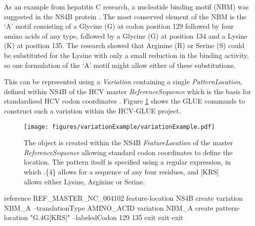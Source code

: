 As an example from hepatitis C research, a nucleotide binding motif (NBM) was
suggested in the NS4B protein \cite{Einav_2004}. The most conserved element of
the NBM is the `A' motif consisting of a Glycine (G) at codon position 129
followed by four amino acids of any type, followed by a Glycine (G) at position
134 and a Lysine (K) at position 135. The research showed that Arginine (R) or
Serine (S) could be substituted for the Lysine with only a small reduction in
the binding activity, so one formulation of the `A' motif might allow either of
these substitutions.

This can be represented using a \emph{Variation} containing a single
\emph{PatternLocation}, defined within NS4B of the HCV master
\emph{ReferenceSequence} which is the basis for standardised HCV codon
coordinates \cite{Kuiken_2006}. Figure \ref{fig:variationExample} shows the GLUE
commands to construct such a variation within the HCV-GLUE project.

  \begin{figure}[h!]
  \begin{center}
  \texttt{[image: figures/variationExample/variationExample.pdf]}
  \end{center}
  \caption{ The object is created within
  the NS4B \emph{FeatureLocation} of the master \emph{ReferenceSequence}
  allowing standard codon coordinates to define the location. The pattern
  itself is specified using a regular expression, in which .{\{4\}} allows for a
  sequence of any four residues, and [KRS] allows either Lysine, Arginine or
  Serine. }
  \label{fig:variationExample}
      \end{figure}

      
  reference REF_MASTER_NC_004102
  feature-location NS4B
    create variation NBM_A --translationType AMINO_ACID
    variation NBM_A
      create pattern-location "G.{4}G[KRS]" --labeledCodon 129 135
      exit
    exit
  exit
  